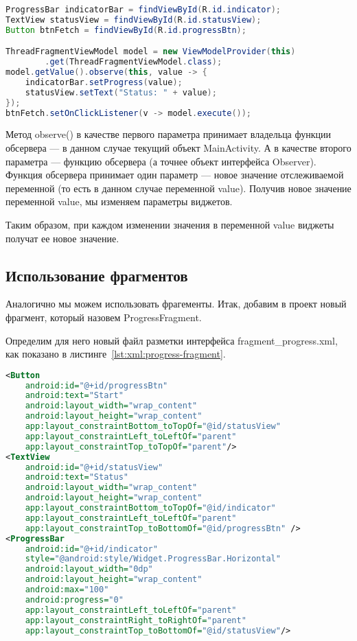 \begin{lstlisting}[language=Java
	, label=lst:java:
	]
ProgressBar indicatorBar = findViewById(R.id.indicator);
TextView statusView = findViewById(R.id.statusView);
Button btnFetch = findViewById(R.id.progressBtn);

ThreadFragmentViewModel model = new ViewModelProvider(this)
		.get(ThreadFragmentViewModel.class);
model.getValue().observe(this, value -> {
	indicatorBar.setProgress(value);
	statusView.setText("Status: " + value);
});
btnFetch.setOnClickListener(v -> model.execute());
\end{lstlisting}

Метод observe() в качестве первого параметра принимает владельца функции
обсервера --- в данном случае текущий объект MainActivity.
А в качестве второго параметра --- функцию обсервера
(а точнее объект интерфейса Observer). Функция обсервера принимает один
параметр --- новое значение отслеживаемой переменной (то есть в данном
случае переменной value). Получив новое значение переменной value,
мы изменяем параметры виджетов.\par
Таким образом, при каждом изменении значения в переменной value
виджеты получат ее новое значение.

\subsection{Использование фрагментов}
Аналогично мы можем использовать фрагементы. Итак, добавим в проект
новый фрагмент, который назовем ProgressFragment.\par
Определим для него новый файл разметки интерфейса
fragment\_progress.xml, как показано
в листинге~\ref{lst:xml:progress-fragment}.

\begin{lstlisting}[language=XML
	, label=lst:xml:progress-fragment
	]
<Button
	android:id="@+id/progressBtn"
	android:text="Start"
	android:layout_width="wrap_content"
	android:layout_height="wrap_content"
	app:layout_constraintBottom_toTopOf="@id/statusView"
	app:layout_constraintLeft_toLeftOf="parent"
	app:layout_constraintTop_toTopOf="parent"/>
<TextView
	android:id="@+id/statusView"
	android:text="Status"
	android:layout_width="wrap_content"
	android:layout_height="wrap_content"
	app:layout_constraintBottom_toTopOf="@id/indicator"
	app:layout_constraintLeft_toLeftOf="parent"
	app:layout_constraintTop_toBottomOf="@id/progressBtn" />
<ProgressBar
	android:id="@+id/indicator"
	style="@android:style/Widget.ProgressBar.Horizontal"
	android:layout_width="0dp"
	android:layout_height="wrap_content"
	android:max="100"
	android:progress="0"
	app:layout_constraintLeft_toLeftOf="parent"
	app:layout_constraintRight_toRightOf="parent"
	app:layout_constraintTop_toBottomOf="@id/statusView"/>
\end{lstlisting}

